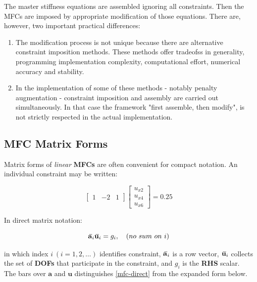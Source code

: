 \documentclass[10pt,b5paper,titlepage]{book}
\newcommand{\m}{\mathbf}
\newcommand{\closure}[2][3]{%
{}\mkern#1mu\overline{\mkern-#1mu#2}}
\begin{document}
The master stiffness equations are assembled ignoring all constraints. Then the MFCs
are imposed by appropriate modification of those equations. There are, however,
two important practical differences:

\begin{enumerate}
    \item The modification process is not unique because there are alternative
        constraint imposition methods. These methods offer tradeofss in generality,
        programming implementation complexity, computational effort, numerical
        accuracy and stability.

    \item In the implementation of some of these methods - notably penalty augmentation
        - constraint imposition and assembly are carried out simultaneously. In that
        case the framework "first assemble, then modify", is not strictly respected
        in the actual implementation.
\end{enumerate}


\subsection{MFC Matrix Forms}

Matrix forms of \textit{linear} \textbf{MFCs} are often convenient for compact
notation. An individual constraint may be written:

\begin{equation}\label{mfc-matrix}
    \begin{bmatrix}
        1 & -2 & 1
    \end{bmatrix}
    \begin{bmatrix}
        u_{x2} \\
        u_{x4} \\
        u_{x6}
    \end{bmatrix}
    = 0.25
\end{equation}

In direct matrix notation:

\begin{equation}\label{mfc-direct}
    \closure{\m{a}}_i \closure{\m{u}}_i = g_i, \quad (no\ sum\ on\ i)
\end{equation}

in which index $ i\ (i = 1, 2,\dots) $ identifies constraint, $ \closure{\m{a}}_i $
is a row vector, $ \closure{\m{u}}_i $ collects the set of \textbf{DOFs}
that participate in the constraint, and $ g_i $ is the \textbf{RHS} scalar.
The bars over $ \m{a} $ and $ \m{u} $ distinguishes
\eqref{mfc-direct} from the expanded form below.
\end{document}
